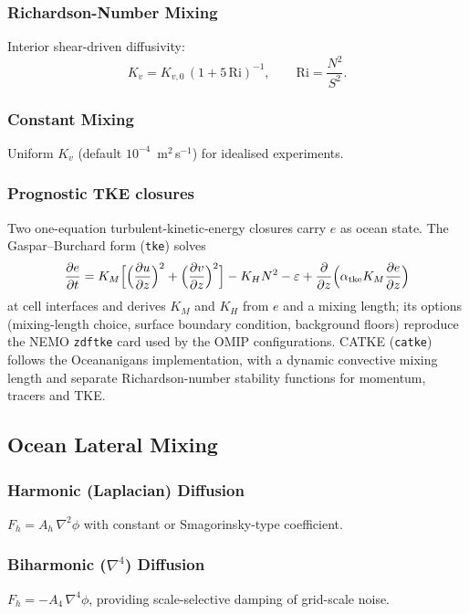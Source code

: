 \documentclass[11pt,a4paper]{article}
\newcommand{\pp}{\partial}
\begin{document}
\subsubsection{Richardson-Number Mixing}
Interior shear-driven diffusivity:
\begin{equation}
  K_v = K_{v,0}\,(1+5\,\mathrm{Ri})^{-1}, \qquad \mathrm{Ri}=\frac{N^2}{S^2}.
\end{equation}

\subsubsection{Constant Mixing}
Uniform $K_v$ (default $10^{-4}$~m$^2$\,s$^{-1}$) for idealised experiments.

\subsubsection{Prognostic TKE closures}
Two one-equation turbulent-kinetic-energy closures carry $e$ as ocean state.  The Gaspar--Burchard form (\texttt{tke}) solves
\begin{equation}
  \frac{\pp e}{\pp t} = K_M\Bigl[\Bigl(\frac{\pp u}{\pp z}\Bigr)^2+\Bigl(\frac{\pp v}{\pp z}\Bigr)^2\Bigr] - K_H N^2 - \varepsilon + \frac{\pp}{\pp z}\Bigl(\alpha_{\mathrm{tke}}K_M\frac{\pp e}{\pp z}\Bigr)
\end{equation}
at cell interfaces and derives $K_M$ and $K_H$ from $e$ and a mixing length; its options (mixing-length choice, surface boundary condition, background floors) reproduce the NEMO \texttt{zdftke} card used by the OMIP configurations.  CATKE (\texttt{catke}) follows the Oceananigans implementation, with a dynamic convective mixing length and separate Richardson-number stability functions for momentum, tracers and TKE.

\subsection{Ocean Lateral Mixing}

\subsubsection{Harmonic (Laplacian) Diffusion}
$F_h = A_h\,\nabla^2\phi$ with constant or Smagorinsky-type coefficient.

\subsubsection{Biharmonic ($\nabla^4$) Diffusion}
$F_h = -A_4\,\nabla^4\phi$, providing scale-selective damping of grid-scale noise.
\end{document}
